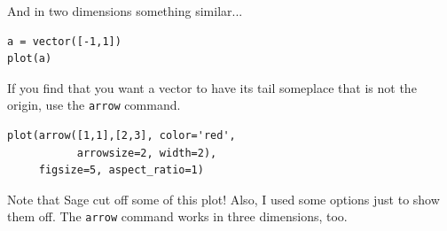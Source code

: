 \documentclass[10pt,]{book}
\theoremstyle{plain}
\theoremstyle{definition}
\numberwithin{equation}{section}
\begin{document}
And in two dimensions something similar...%
\begin{lstlisting}[style=sageinput]
a = vector([-1,1])
plot(a)
\end{lstlisting}
\par
If you find that you want a vector to have its tail someplace
              that is not the origin, use the \verb?arrow? command.%
\begin{lstlisting}[style=sageinput]
plot(arrow([1,1],[2,3], color='red',
           arrowsize=2, width=2),
     figsize=5, aspect_ratio=1)
\end{lstlisting}
\par
Note that Sage cut off some of this plot! Also, I used some options
              just to show them off. The \verb?arrow? command works in three dimensions,
              too.
\typeout{************************************************}
\typeout{************************************************}
\end{document}

